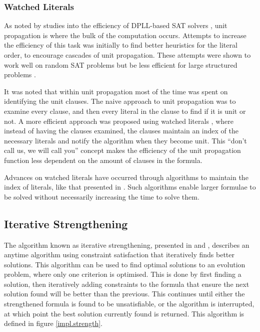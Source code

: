 \subsubsection{Watched Literals}
As noted by studies into the efficiency of DPLL-based SAT solvers \citep{dixon2004automating}, unit propagation is where the bulk of the computation occurs.
Attempts to increase the efficiency of this task was initially to find better heuristics \citep{JamesMCrawford1996} for the literal order, to encourage cascades of unit propagation.
These attempts were shown to work well on random SAT problems but be less efficient for large structured problems \citep{dixon2004automating}.

It was noted that within unit propagation most of the time was spent on identifying the unit clauses.
The naive approach to unit propagation was to examine every clause, and then every literal in the clause to find if it is unit or not.
A more efficient approach was proposed using watched literals \citep{Madigan2001}, where instead of having the clauses examined, 
the clauses maintain an index of the necessary literals and notify the algorithm when they become unit.
This ``don't call us, we will call you'' concept makes the efficiency of the unit propagation function less dependent on the amount of clauses in the formula.

Advances on watched literals have occurred through algorithms to maintain the index of literals, like that presented in \citep{Moskewicz2001}.
Such algorithms enable larger formulae to be solved without necessarily increasing the time to solve them.


\subsection{Iterative Strengthening}
The algorithm known as iterative strengthening, presented in \citep{calistri1994iterative} and \citep{le2010sat4j}, 
describes an anytime algorithm using constraint satisfaction that iteratively finds better solutions.
This algorithm can be used to find optimal solutions to an evolution problem, where only one criterion is optimised.
This is done by first finding a solution, then iteratively adding constraints to the formula that ensure the next solution found will be better than the previous.
This continues until either the strengthened formula is found to be unsatisfiable, or the algorithm is interrupted, at which point the best solution currently found is returned. 
This algorithm is defined in figure \ref{impl.strength}.

